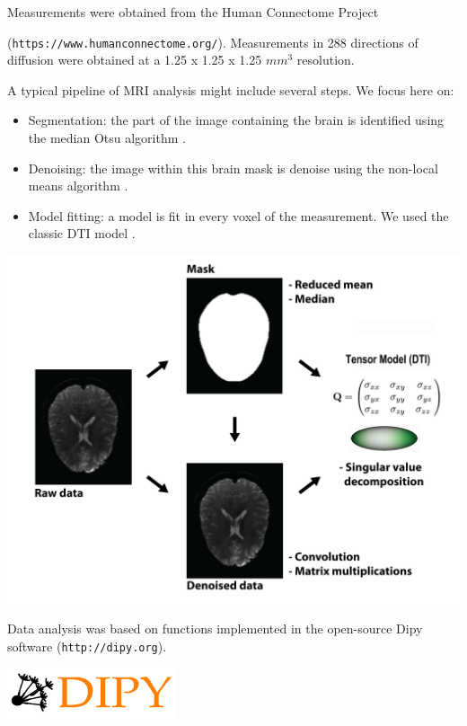 \documentclass[a0,landscape]{a0poster}
\begin{document}
\begin{multicols}{3}
Measurements were obtained from the Human Connectome Project

(\texttt{https://www.humanconnectome.org/}). Measurements in 288 directions of diffusion were obtained at a 1.25 x 1.25 x 1.25 $mm^3$ resolution.

A typical pipeline of MRI analysis might include several steps. We focus here on:
\begin{itemize}

  \item Segmentation: the part of the image containing the brain is identified using the median Otsu algorithm \cite{Otsu1975-qg}.

  \item Denoising: the image within this brain mask is denoise using the non-local means algorithm \cite{Coupe2008-bx}.

 \item Model fitting: a model is fit in every voxel of the measurement. We used the classic DTI model \cite{Basser1994-hg}.

\end{itemize}

\includegraphics[width=25cm]{pipeline.png}

\begin{minipage}[b]{0.75\linewidth}
  Data analysis was based on functions implemented in the open-source Dipy
  software (\texttt{http://dipy.org}).
\end{minipage}
\begin{minipage}[b]{0.25\linewidth}
  \includegraphics[width=5cm]{dipy-logo.png}
\end{minipage}


\end{multicols}
\end{document}
